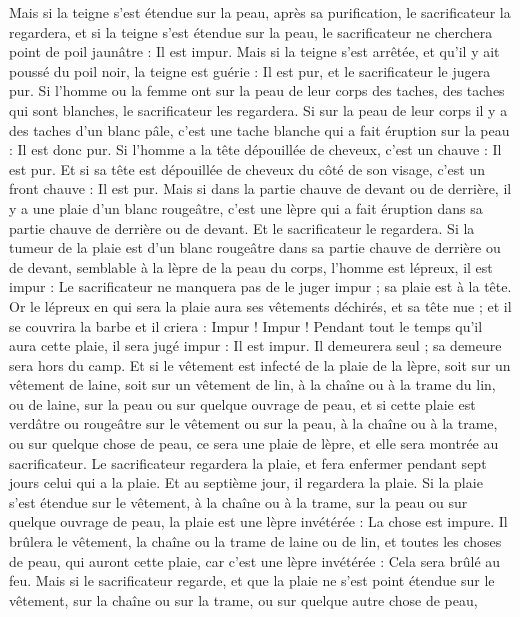 \begin{multicols}{2}
Mais si la teigne s’est étendue sur la peau, après sa purification, le sacrificateur la regardera,
et si la teigne s’est étendue sur la peau, le sacrificateur ne cherchera point de poil jaunâtre : Il est impur.
Mais si la teigne s’est arrêtée, et qu’il y ait poussé du poil noir, la teigne est guérie : Il est pur, et le sacrificateur le jugera pur.
Si l'homme ou la femme ont sur la peau de leur corps des taches, des taches qui sont blanches,
le sacrificateur les regardera. Si sur la peau de leur corps il y a des taches d’un blanc pâle, c'est une tache blanche qui a fait éruption sur la peau : Il est donc pur.
Si l'homme a la tête dépouillée de cheveux, c’est un chauve : Il est pur.
Et si sa tête est dépouillée de cheveux du côté de son visage, c’est un front chauve : Il est pur.
Mais si dans la partie chauve de devant ou de derrière, il y a une plaie d’un blanc rougeâtre, c'est une lèpre qui a fait éruption dans sa partie chauve de derrière ou de devant.
Et le sacrificateur le regardera. Si la tumeur de la plaie est d’un blanc rougeâtre dans sa partie chauve de derrière ou de devant, semblable à la lèpre de la peau du corps,
l'homme est lépreux, il est impur : Le sacrificateur ne manquera pas de le juger impur ; sa plaie est à la tête.
Or le lépreux en qui sera la plaie aura ses vêtements déchirés, et sa tête nue ; et il se couvrira la barbe et il criera : Impur ! Impur !
Pendant tout le temps qu'il aura cette plaie, il sera jugé impur : Il est impur. Il demeurera seul ; sa demeure sera hors du camp.
Et si le vêtement est infecté de la plaie de la lèpre, soit sur un vêtement de laine, soit sur un vêtement de lin,
à la chaîne ou à la trame du lin, ou de laine, sur la peau ou sur quelque ouvrage de peau,
et si cette plaie est verdâtre ou rougeâtre sur le vêtement ou sur la peau, à la chaîne ou à la trame, ou sur quelque chose de peau, ce sera une plaie de lèpre, et elle sera montrée au sacrificateur.
Le sacrificateur regardera la plaie, et fera enfermer pendant sept jours celui qui a la plaie.
Et au septième jour, il regardera la plaie. Si la plaie s’est étendue sur le vêtement, à la chaîne ou à la trame, sur la peau ou sur quelque ouvrage de peau, la plaie est une lèpre invétérée : La chose est impure.
Il brûlera le vêtement, la chaîne ou la trame de laine ou de lin, et toutes les choses de peau, qui auront cette plaie, car c'est une lèpre invétérée : Cela sera brûlé au feu.
Mais si le sacrificateur regarde, et que la plaie ne s’est point étendue sur le vêtement, sur la chaîne ou sur la trame, ou sur quelque autre chose de peau,

\end{multicols}
